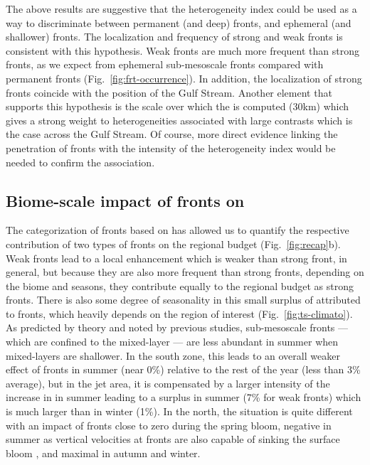 The above results are suggestive that the heterogeneity index could be used as a way to discriminate between permanent (and deep) fronts, and ephemeral (and shallower) fronts.
The localization and frequency of strong and weak fronts is consistent with this hypothesis.
Weak fronts are much more frequent than strong fronts, as we expect from ephemeral sub-mesoscale fronts compared with permanent fronts (Fig.~\ref{fig:frt-occurrence}).
In addition, the localization of strong fronts coincide with the position of the Gulf Stream.
Another element that supports this hypothesis is the scale over which the  is computed (30km) which gives a strong weight to  heterogeneities associated with large contrasts which is the case across the Gulf Stream.
Of course, more direct evidence linking the penetration of fronts with the intensity of the heterogeneity index would be needed to confirm the association.

\subsection{Biome-scale impact of fronts on }

The categorization of fronts based on  has allowed us to quantify the respective contribution of two types of fronts on the regional  budget (Fig.~\ref{fig:recap}b).
Weak fronts lead to a local  enhancement which is weaker than strong front, in general, but because they are also more frequent than strong fronts, depending on the biome and seasons, they contribute equally to the regional  budget as strong fronts.
There is also some degree of seasonality in this small surplus of  attributed to fronts, which heavily depends on the region of interest (Fig.~\ref{fig:ts-climato}).
As predicted by theory and noted by previous studies, sub-mesoscale fronts --- which are confined to the mixed-layer --- are less abundant in summer when mixed-layers are shallower.
In the south zone, this leads to an overall weaker effect of fronts in summer (near 0\%) relative to the rest of the year (less than 3\% average), but in the jet area, it is compensated by a larger intensity of the increase in  in summer leading to a  surplus in summer (7\% for weak fronts) which is much larger than in winter (1\%).
In the north, the situation is quite different with an impact of fronts close to zero during the spring bloom, negative in summer as vertical velocities at fronts are also capable of sinking the surface bloom \parencite{levy_2018}, and maximal in autumn and winter.

